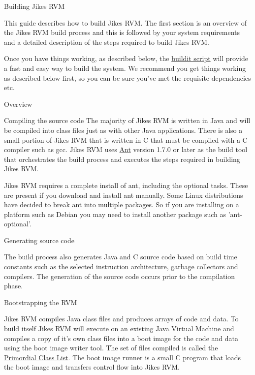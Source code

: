 \begin{section}{Building Jikes RVM}
\label{sec:buildingjikesrvm}

This guide describes how to build Jikes RVM. The first section is an overview of the Jikes RVM build process and this is followed by your system requirements and a detailed description of the steps required to build Jikes RVM.

Once you have things working, as described below, the \hyperref[sec:usingbuildit]{buildit script} will provide a fast and easy way to build the system.  We recommend you get things working as described below first, so you can be sure you've met the requisite dependencies etc.

\begin{subsection}{Overview}

\begin{subsubsection}{Compiling the source code}
The majority of Jikes RVM is written in Java and will be compiled into class files just as with other Java applications. There is also a small portion of Jikes RVM that is written in C that must be compiled with a C compiler such as gcc.  Jikes RVM uses \href{https://ant.apache.org}{Ant} version 1.7.0 or later as the build tool that orchestrates the build process and executes the steps required in building Jikes RVM.

Jikes RVM requires a complete install of ant, including the optional tasks. These are present if you download and install ant manually. Some Linux distributions have decided to break ant into multiple packages. So if you are installing on a platform such as Debian you may need to install another package such as 'ant-optional'.
\end{subsubsection}

\begin{subsubsection}{Generating source code}

The build process also generates Java and C source code based on build time constants such as the selected instruction architecture, garbage collectors and compilers. The generation of the source code occurs prior to the compilation phase.

\end{subsubsection}

\begin{subsubsection}{Bootstrapping the RVM}

Jikes RVM compiles Java class files and produces arrays of code and data. To build itself Jikes RVM will execute on an existing Java Virtual Machine and compiles a copy of it's own class files into a boot image for the code and data using the boot image writer tool. The set of files compiled is called the \hyperref[sec:primordialclasslist]{Primordial Class List}. The boot image runner is a small C program that loads the boot image and transfers control flow into Jikes RVM.


\end{subsubsection}
\end{subsection}
\end{section}
